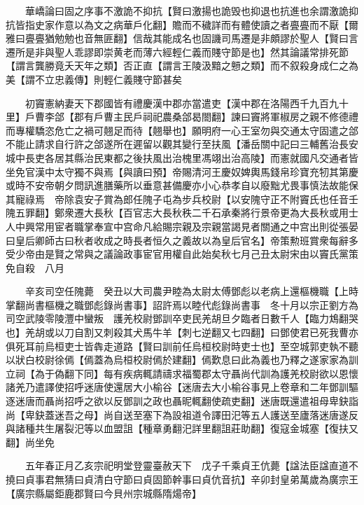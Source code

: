 　　華嶠論曰固之序事不激詭不抑抗【賢曰激揚也詭毁也抑退也抗進也余謂激詭抑抗皆指史家作意以為文之病華戶化翻】贍而不穢詳而有體使讀之者亹亹而不厭【爾雅曰亹亹猶勉勉也音無匪翻】信哉其能成名也固譏司馬遷是非頗謬於聖人【賢曰言遷所是非與聖人乖謬即崇黄老而薄六經輕仁義而賤守節是也】然其論議常排死節【謂言龔勝竟夭天年之類】否正直【謂言王陵汲黯之戅之類】而不叙殺身成仁之為美【謂不立忠義傳】則輕仁義賤守節甚矣

　　初竇憲納妻天下郡國皆有禮慶漢中郡亦當遣吏【漢中郡在洛陽西千九百九十里】戶曹李郃【郡有戶曹主民戶祠祀農桑郃曷閤翻】諫曰竇將軍椒房之親不修德禮而專權驕恣危亡之禍可翹足而待【翹舉也】願明府一心王室勿與交通太守固遣之郃不能止請求自行許之郃遂所在遲留以觀其變行至扶風【潘岳關中記曰三輔舊治長安城中長吏各居其縣治民東都之後扶風出治槐里馮翊出治高陵】而憲就國凡交通者皆坐免官漢中太守獨不與焉【與讀曰預】帝賜清河王慶奴婢輿馬錢帛珍寶充牣其第慶或時不安帝朝夕問訊進膳藥所以垂意甚備慶亦小心恭孝自以廢黜尤畏事慎法故能保其寵祿焉　帝除袁安子賞為郎任隗子屯為步兵校尉【以安隗守正不附竇氏也任音壬隗五罪翻】鄭衆遷大長秋【百官志大長秋秩二千石承秦將行景帝更為大長秋或用士人中興常用宦者職掌奉宣中宫命凡給賜宗親及宗親當謁見者關通之中宫出則從張晏曰皇后卿師古曰秋者收成之時長者恒久之義故以為皇后官名】帝策勲班賞衆每辭多受少帝由是賢之常與之議論政事宦官用權自此始矣秋七月己丑太尉宋由以竇氏黨策免自殺　八月

　　辛亥司空任隗薨　癸丑以大司農尹睦為太尉太傅鄧彪以老病上還樞機職【上時掌翻尚書樞機之職鄧彪錄尚書事】詔許焉以睦代彪錄尚書事　冬十月以宗正劉方為司空武陵零陵灃中蠻叛　護羌校尉鄧訓卒吏民羌胡旦夕臨者日數千人【臨力鴆翻哭也】羌胡或以刀自割又刺殺其犬馬牛羊【刺七逆翻又七四翻】曰鄧使君已死我曹亦俱死耳前烏桓吏士皆犇走道路【賢曰訓前任烏桓校尉時吏士也】至空城郭吏執不聽以狀白校尉徐傿【傿蓋為烏桓校尉傿於建翻】傿歎息曰此為義也乃釋之遂家家為訓立祠【為于偽翻下同】每有疾病輒請禱求福蜀郡太守聶尚代訓為護羌校尉欲以恩懷諸羌乃遣譯使招呼迷唐使還居大小榆谷【迷唐去大小榆谷事見上卷章和二年鄧訓驅逐迷唐而聶尚招呼之欲以反鄧訓之政也聶昵輒翻使疏吏翻】迷唐既還遣祖母卑鈌詣尚【卑鈌蓋迷吾之母】尚自送至塞下為設祖道令譯田汜等五人護送至廬落迷唐遂反與諸種共生屠裂汜等以血盟詛【種章勇翻汜詳里翻詛莊助翻】復寇金城塞【復扶又翻】尚坐免

　　五年春正月乙亥宗祀明堂登靈臺赦天下　戊子千乘貞王伉薨【諡法臣諡直道不撓曰貞事君無猜曰貞清白守節曰貞固節幹事曰貞伉音抗】辛卯封皇弟萬歲為廣宗王【廣宗縣屬鉅鹿郡賢曰今貝州宗城縣隋煬帝】

